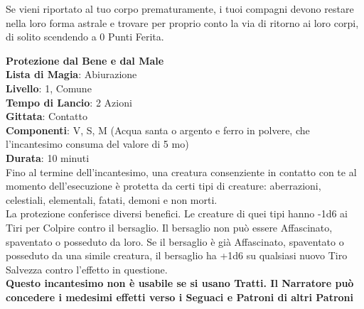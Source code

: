 \documentclass[a4paper,twoside,openany]{book}
\begin{document}
\begin{multicols}{2}
Se vieni riportato al tuo corpo prematuramente, i tuoi compagni devono restare nella loro forma astrale e trovare per proprio conto la via di ritorno ai loro corpi, di solito scendendo a 0 Punti Ferita.

\medskip\textbf{Protezione dal Bene e dal Male}\\
\textbf{Lista di Magia}: Abiurazione\\
\textbf{Livello}: 1, Comune\\
\textbf{Tempo di Lancio}: 2 Azioni\\
\textbf{Gittata}: Contatto\\
\textbf{Componenti}: V, S, M (Acqua santa o argento e ferro in polvere, che l'incantesimo consuma del valore di 5 mo)\\
\textbf{Durata}: 10 minuti\\
Fino al termine dell'incantesimo, una creatura consenziente in contatto con te al momento dell'esecuzione è protetta da certi tipi di creature: aberrazioni, celestiali, elementali, fatati, demoni e non morti.\\
La protezione conferisce diversi benefici. Le creature di quei tipi hanno -1d6 ai Tiri per Colpire contro il bersaglio. Il bersaglio non può essere Affascinato, spaventato o posseduto da loro. Se il bersaglio è già Affascinato, spaventato o posseduto da una simile creatura, il bersaglio ha +1d6 su qualsiasi nuovo Tiro Salvezza contro l'effetto in questione.\\
\textbf{Questo incantesimo non è usabile se si usano Tratti. Il Narratore può concedere i medesimi effetti verso i Seguaci e Patroni di altri Patroni}


\end{multicols}
\end{document}
